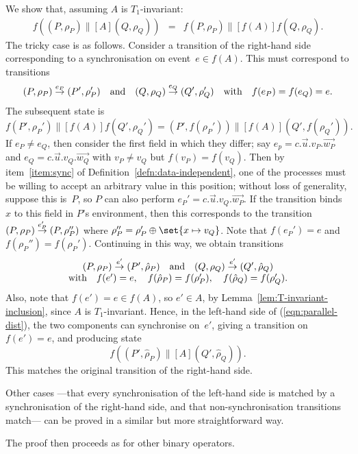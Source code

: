 We show that, assuming $A$ is $T_1$-invariant:
%
\begin{eqnarray}
\label{eqn:parallel-dist}
f((P,\rho_P) \parallel[A] (Q,\rho_Q)) & = & 
  f(P,\rho_P) \parallel[f(A)] f(Q,\rho_Q).
\end{eqnarray}
%
The tricky case is as follows.  Consider a transition of the right-hand side
corresponding to a synchronisation on event~$e \in f(A)$.  This must
correspond to transitions 
\[
(P,\rho_P) \stackrel{e_P}{\rightarrow} (P',\rho_P') \quad\mbox{and}\quad
(Q,\rho_Q) \stackrel{e_Q}{\rightarrow} (Q',\rho_Q') \quad
\mbox{with}\quad f(e_P) = f(e_Q) = e.
\]
The subsequent state is 
\[
f(P',\rho_P') \parallel[f(A)] f(Q',\rho_Q') = 
  (P',f(\rho_P')) \parallel[f(A)] (Q',f(\rho_Q')).
\]
If $e_P \ne e_Q$, then consider the first field in which they differ; say $e_p
= c.\vec{u}.v_P.\vec{w_P}$ and $e_Q = c.\vec{u}.v_Q.\vec{w_Q}$ with $v_P \ne
v_Q$ but $f(v_P) = f(v_Q)$.
%
Then by item~\ref{item:sync} of Definition~\ref{defn:data-independent}, one of
the processes must be willing to accept an arbitrary value in this position;
without loss of generality, suppose this is~$P$, so $P$ can also perform $e_P'
= c.\vec{u}.v_Q.\vec{w_P}$.  If the transition binds $x$ to this field in
$P$'s environment, then this corresponds to the transition
$(P,\rho_P) \stackrel{e_P'}{\rightarrow} (P,\rho_P'')$ where $\rho_P''
= \rho_P' \oplus \set{x \mapsto v_Q}$.  Note that $f(e_P') = e$ and
$f(\rho_P'') = f(\rho_P')$.
%
Continuing in this way, we obtain transitions
\[
\begin{array}{c}
(P,\rho_P) \stackrel{e'}{\rightarrow} (P',\hat\rho_P) \quad\mbox{and}\quad
(Q,\rho_Q) \stackrel{e'}{\rightarrow} (Q',\hat\rho_Q) \\
\mbox{with}\quad f(e')  = e, \quad 
f(\hat\rho_P) = f(\rho_P'), \quad f(\hat\rho_Q) = f(\rho_Q').
\end{array}
\]
Also, note that $f(e') = e \in f(A)$, so $e' \in A$, by
Lemma~\ref{lem:T-invariant-inclusion}, since $A$ is $T_1$-invariant.
%
Hence, in the left-hand side of (\ref{eqn:parallel-dist}), the two
components can synchronise on~$e'$, giving a transition on $f(e') = e$, and
producing state 
\[
f( (P',\hat\rho_P) \parallel[A] (Q',\hat\rho_Q) ) .
\]
This matches the original transition of the right-hand side.

Other cases ---that every synchronisation of the left-hand side is matched by
a synchronisation of the right-hand side, and that non-synchronisation
transitions match--- can be proved in a similar but more straightforward way.

The proof then proceeds as for other binary operators.  

